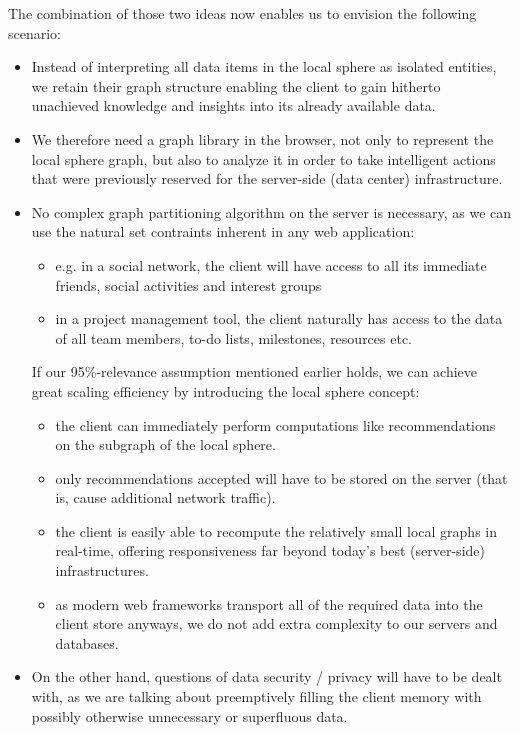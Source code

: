 	The combination of those two ideas now enables us to envision the following scenario:
	
	\begin{itemize}
		\item Instead of interpreting all data items in the local sphere as isolated entities, we retain their graph structure enabling the client to gain hitherto unachieved knowledge and insights into its already available data.
		\item We therefore need a graph library in the browser, not only to represent the local sphere graph, but also to analyze it in order to take intelligent actions that were previously reserved for the server-side (data center) infrastructure.
		\item No complex graph partitioning algorithm on the server is necessary, as we can use the natural set contraints inherent in any web application:
		\begin{itemize}
			\item e.g. in a social network, the client will have access to all its immediate friends, social activities and interest groups
			\item in a project management tool, the client naturally has access to the data of all team members, to-do lists, milestones, resources etc.
		\end{itemize}
		If our 95\%-relevance assumption mentioned earlier holds, we can achieve great scaling efficiency by introducing the local sphere concept:
		\begin{itemize}
			\item the client can immediately perform computations like recommendations on the subgraph of the local sphere.
			\item only recommendations accepted will have to be stored on the server (that is, cause additional network traffic).
			\item the client is easily able to recompute the relatively small local graphs in real-time, offering responsiveness far beyond today's best (server-side) infrastructures.
			\item as modern web frameworks transport all of the required data into the client store anyways, we do not add extra complexity to our servers and databases.
		\end{itemize}
		\item On the other hand, questions of data security / privacy will have to be dealt with, as we are talking about preemptively filling the client memory with possibly otherwise unnecessary or superfluous data.
	\end{itemize}
	
